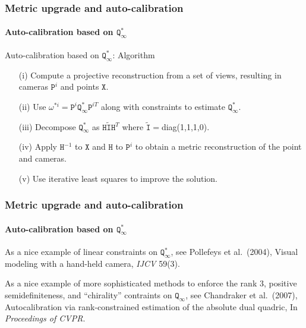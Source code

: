 \documentclass[aspectratio=169]{beamer}
\newcommand{\mat}[1]{\mathtt{#1}}
\begin{document}
\begin{frame}
\frametitle{Metric upgrade and auto-calibration}
\framesubtitle{Auto-calibration based on $\mat{Q}_{\infty}^*$}

\begin{block}{Auto-calibration based on $\mat{Q}_{\infty}^*$: Algorithm}
\begin{itemize}
\item[(i)] Compute a projective reconstruction from a set of views,
    resulting in cameras $\mat{P}^i$ and points $\mat{X}$.
\item[(ii)] Use $\mat{\omega}^{*i} = \mat{P}^i\mat{Q}^*_{\infty}\mat{P}^{iT}$
    along with constraints to estimate $\mat{Q}^*_{\infty}$.
\item[(iii)] Decompose $\mat{Q}^*_{\infty}$ as
    $\mat{H}\tilde{\mat{I}}\mat{H}^T$ where $\tilde{\mat{I}}=$diag(1,1,1,0).
\item[(iv)] Apply $\mat{H}^{-1}$ to $\mat{X}$ and $\mat{H}$ to
    $\mat{P}^i$ to obtain a metric reconstruction of the point and cameras.
\item[(v)] Use iterative least squares to improve the solution.
\end{itemize}

\end{block}

\end{frame}


\begin{frame}
\frametitle{Metric upgrade and auto-calibration}
\framesubtitle{Auto-calibration based on $\mat{Q}_{\infty}^*$}

As a nice example of linear constraints on $\mat{Q}_{\infty}^*$,
see Pollefeys et al.\ (2004), Visual modeling with a hand-held
camera, \textit{IJCV} 59(3).

\medskip

As a nice example of more sophisticated methods to enforce the
rank 3, positive semidefiniteness, and ``chirality'' contraints on
$\mat{Q}_{\infty}$, see Chandraker et al.\ (2007), Autocalibration
via rank-constrained estimation of the absolute dual quadric,
In \textit{Proceedings of CVPR}.

\end{frame}
\end{document}
